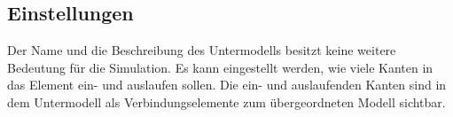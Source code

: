 \subsection*{Einstellungen}

Der Name und die Beschreibung des Untermodells besitzt keine weitere Bedeutung für die Simulation.
Es kann eingestellt werden, wie viele Kanten in das Element ein- und auslaufen sollen.
Die ein- und auslaufenden Kanten sind in dem Untermodell als Verbindungselemente zum
übergeordneten Modell sichtbar.





